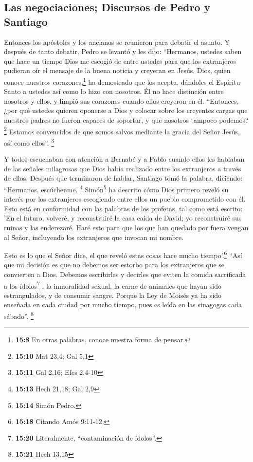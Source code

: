 \hypertarget{las-negociaciones-discursos-de-pedro-y-santiago}{%
\subsection{Las negociaciones; Discursos de Pedro y
Santiago}\label{las-negociaciones-discursos-de-pedro-y-santiago}}

 Entonces los apóstoles y los ancianos se reunieron para
debatir el asunto.  Y después de tanto debatir, Pedro se
levantó y les dijo: ``Hermanos, ustedes saben que hace un tiempo Dios me
escogió de entre ustedes para que los extranjeros pudieran oír el
mensaje de la buena noticia y creyeran en Jesús.  Dios,
quien conoce nuestros corazones,\footnote{\textbf{15:8} En otras
  palabras, conoce nuestra forma de pensar.} ha demostrado que los
acepta, dándoles el Espíritu Santo a ustedes así como lo hizo con
nosotros.  Él no hace distinción entre nosotros y ellos, y
limpió sus corazones cuando ellos creyeron en él. 
``Entonces, ¿por qué ustedes quieren oponerse a Dios y colocar sobre los
creyentes cargas que nuestros padres no fueron capaces de soportar, y
que nosotros tampoco podemos? \footnote{\textbf{15:10} Mat 23,4; Gal 5,1}
 Estamos convencidos de que somos salvos mediante la
gracia del Señor Jesús, así como ellos''. \footnote{\textbf{15:11} Gal
  2,16; Efes 2,4-10}

 Y todos escuchaban con atención a Bernabé y a Pablo
cuando ellos les hablaban de las señales milagrosas que Dios había
realizado entre los extranjeros a través de ellos. 
Después que terminaron de hablar, Santiago tomó la palabra, diciendo:
``Hermanos, escúchenme. \footnote{\textbf{15:13} Hech 21,18; Gal 2,9}
 Simón\footnote{\textbf{15:14} Simón Pedro.} ha descrito
cómo Dios primero reveló su interés por los extranjeros escogiendo entre
ellos un pueblo comprometido con él.  Esto está en
conformidad con las palabras de los profetas, tal como está escrito:
 'En el futuro, volveré, y reconstruiré la casa caída de
David; yo reconstruiré sus ruinas y las enderezaré.  Haré
esto para que los que han quedado por fuera vengan al Señor, incluyendo
los extranjeros que invocan mi nombre.

 Esto es lo que el Señor dice, el que reveló estas cosas
hace mucho tiempo'.\footnote{\textbf{15:18} Citando Amós 9:11-12.}
 ``Así que mi decisión es que no debemos ser estorbo para
los extranjeros que se convierten a Dios.  Debemos
escribirles y decirles que eviten la comida sacrificada a los
ídolos\footnote{\textbf{15:20} Literalmente, ``contaminación de
  ídolos''.} , la inmoralidad sexual, la carne de animales que hayan
sido estrangulados, y de consumir sangre.  Porque la Ley
de Moisés ya ha sido enseñada en cada ciudad por mucho tiempo, pues es
leída en las sinagogas cada sábado''. \footnote{\textbf{15:21} Hech
  13,15}

